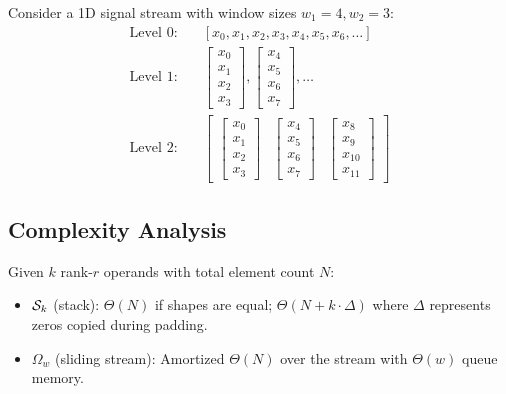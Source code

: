 \begin{example}
Consider a 1D signal stream with window sizes $w_1 = 4, w_2 = 3$:
\begin{align}
\text{Level 0:} &\quad [x_0, x_1, x_2, x_3, x_4, x_5, x_6, \ldots] \\
\text{Level 1:} &\quad \begin{bmatrix} x_0 \\ x_1 \\ x_2 \\ x_3 \end{bmatrix}, \begin{bmatrix} x_4 \\ x_5 \\ x_6 \\ x_7 \end{bmatrix}, \ldots \\
\text{Level 2:} &\quad \begin{bmatrix} \begin{bmatrix} x_0 \\ x_1 \\ x_2 \\ x_3 \end{bmatrix} & \begin{bmatrix} x_4 \\ x_5 \\ x_6 \\ x_7 \end{bmatrix} & \begin{bmatrix} x_8 \\ x_9 \\ x_{10} \\ x_{11} \end{bmatrix} \end{bmatrix}
\end{align}
\end{example}

\subsection{Complexity Analysis}

\begin{proposition}
Given $k$ rank-$r$ operands with total element count $N$:
\begin{itemize}
\item $\mathcal{S}_k$ (stack): $\Theta(N)$ if shapes are equal; $\Theta(N + k \cdot \Delta)$ where $\Delta$ represents zeros copied during padding.
\item $\Omega_w$ (sliding stream): Amortized $\Theta(N)$ over the stream with $\Theta(w)$ queue memory.
\end{itemize}
\end{proposition}

